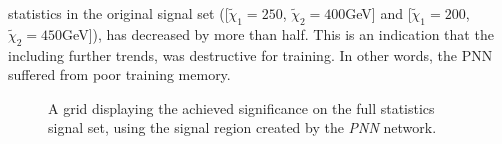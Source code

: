 statistics in the original signal set ([$\tilde{\chi}_1=250$, $\tilde{\chi}_2=400$GeV] and [$\tilde{\chi}_1=200$, $\tilde{\chi}_2=450$GeV]), has decreased by more than half.
This is an indication that the including further trends, was destructive for training. In other words, the \ac{PNN} suffered from poor training memory.
\begin{figure}
    \caption{A grid displaying the achieved significance on the full statistics signal set, using the signal region 
    created by the \emph{PNN} network.}
    \label{fig:PNNPCA_FS_MLMGridSig}
\end{figure}


